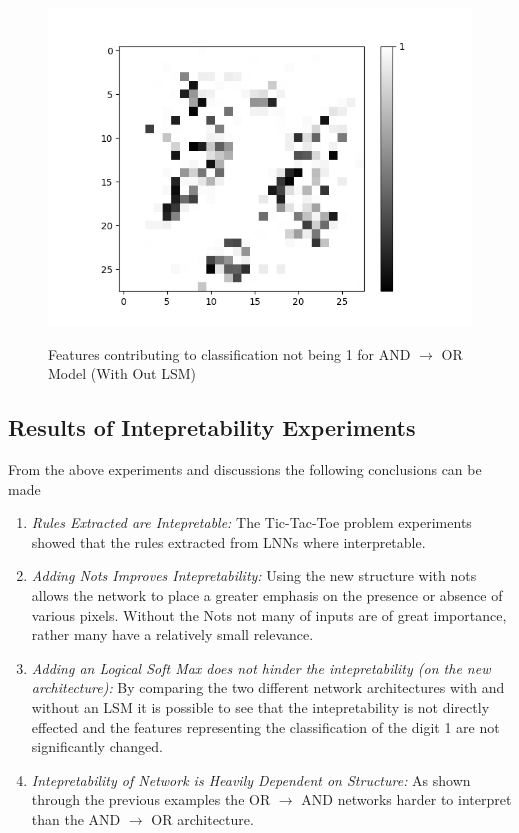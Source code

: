 \begin{minipage}[t]{0.45\textwidth}
\begin{figure}[H]
		\begin{minipage}[b]{0.5\textwidth}
			\captionsetup{labelformat=empty}
			\includegraphics[width=\textwidth]{AND-OR(W-LSM)(1)/Like/False/Layer0-Neuron-9.png}
			\label{}
		\end{minipage}
		\caption{Features contributing to classification not being 1 for AND $\rightarrow$ OR Model (With Out LSM)}
		\label{fig:and-or-lnn-with-lsm-like}
		\hfill
	\end{figure}
	
\end{minipage}


\subsection{Results of Intepretability Experiments}
From the above experiments and discussions the following conclusions can be made

\begin{enumerate}
	\item \textit{Rules Extracted are Intepretable:} The Tic-Tac-Toe problem experiments showed that the rules extracted from LNNs where interpretable.
	\item \textit{Adding Nots Improves Intepretability:} Using the new structure with nots allows the network to place a greater emphasis on the presence or absence of various pixels. Without the Nots not many of inputs are of great importance, rather many have a relatively small relevance.
	\item \textit{Adding an Logical Soft Max does not hinder the intepretability (on the new architecture):} By comparing the two different network architectures with and without an LSM it is possible to see that the intepretability is not directly effected and the features representing the classification of the digit 1 are not significantly changed.
	\item \textit{Intepretability of Network is Heavily Dependent on Structure:} As shown through the previous examples the OR $\rightarrow$ AND networks harder to interpret than the AND $\rightarrow$ OR architecture.
\end{enumerate}


